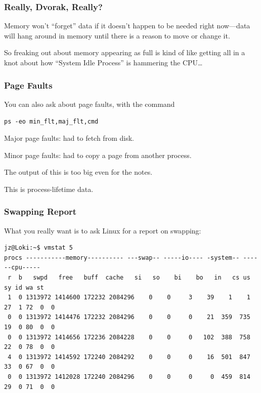 \begin{frame}
\frametitle{Really, Dvorak, Really?}


\begin{changemargin}{1cm}
Memory won't ``forget'' data if it doesn't happen to be needed right now---data will hang around in memory until there is a reason to move or change it. 

So freaking out about memory appearing as full is kind of like getting all in a knot about how ``System Idle Process'' is hammering the CPU\ldots
\end{changemargin}

\end{frame}




\begin{frame}
\frametitle{Page Faults}


\begin{changemargin}{1cm}
You can also ask about page faults, with the command
\begin{center}
\texttt{ps -eo min\_flt,maj\_flt,cmd}
\end{center}

Major page faults: had to fetch from disk. 

Minor page faults: had to copy a page from another process. 

The output of this is too big even for the notes.

This is process-lifetime data.
\end{changemargin}
\end{frame}



\begin{frame}[fragile]
\frametitle{Swapping Report}


\begin{changemargin}{1cm}
What you really want is to ask Linux for a report on swapping:
\end{changemargin}
\vspace*{-2em}
{\scriptsize
\begin{verbatim}
jz@Loki:~$ vmstat 5
procs -----------memory---------- ---swap-- -----io---- -system-- ------cpu-----
 r  b   swpd   free   buff  cache   si   so    bi    bo   in   cs us sy id wa st
 1  0 1313972 1414600 172232 2084296    0    0     3    39    1    1 27  1 72  0  0
 0  0 1313972 1414476 172232 2084296    0    0     0    21  359  735 19  0 80  0  0
 0  0 1313972 1414656 172236 2084228    0    0     0   102  388  758 22  0 78  0  0
 4  0 1313972 1414592 172240 2084292    0    0     0    16  501  847 33  0 67  0  0
 0  0 1313972 1412028 172240 2084296    0    0     0     0  459  814 29  0 71  0  0
\end{verbatim}
}

\end{frame}



